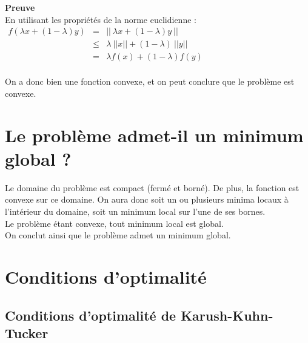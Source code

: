 \documentclass[12pt, a4paper]{report}
\begin{document}
\noindent
\textbf{Preuve}\\
En utilisant les propriétés de la norme euclidienne :\\
$\begin{array}{rcl}
f(\lambda x + (1-\lambda)y) & = & ||\ \lambda x + (1-\lambda)y\ ||\\
 & \leq & \lambda\ ||x|| + (1-\lambda)\ ||y||\\
 & = & \lambda f(x) + (1-\lambda)f(y)\\
\end{array}$

\noindent
\newline
On a donc bien une fonction convexe, et on peut conclure que le problème est convexe.\\


\section{Le problème admet-il un minimum global ?}
Le domaine du problème est compact (fermé et borné). De plus, la fonction est convexe sur ce domaine. On aura donc soit un ou plusieurs minima locaux à l'intérieur du domaine, soit un minimum local sur l'une de ses bornes.\\
Le problème étant convexe, tout minimum local est global.\\
On conclut ainsi que le problème admet un minimum global.\\

\section{Conditions d'optimalité}
\subsection*{Conditions d'optimalité de Karush-Kuhn-Tucker}
\end{document}

